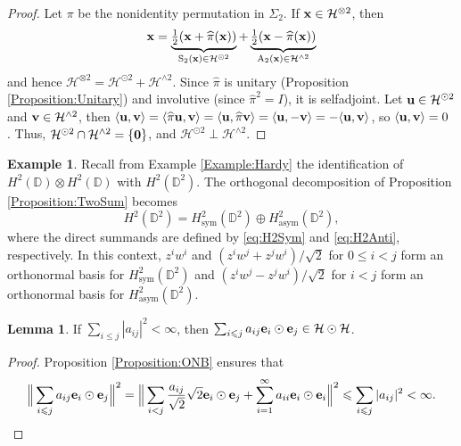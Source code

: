 \documentclass[10pt,reqno]{amsart}
\newcommand{\0}{{\color{lightgray}0}}
\newcommand{\A}{\mathrm{A}}
\renewcommand{\S}{\mathrm{S}}
\newcommand{\D}{\mathbb{D}}
\renewcommand{\leq}{\leqslant}
\newcommand{\h}{\mathcal{H}}
\renewcommand{\hat}{\widehat}
\renewcommand{\vec}[1]{{\bf #1}}
\theoremstyle{definition}
\newtheorem{Lemma}[equation]{Lemma}
\newtheorem{Example}[equation]{Example}
\numberwithin{equation}{section}
\begin{document}
\begin{proof}
Let $\pi$ be the nonidentity permutation in $\Sigma_2$. 
If $\vec{x} \in \h^{\otimes 2}$, then
\begin{equation}\label{orthogonalproj}
    \vec{x}
    =\underbrace{\tfrac{1}{2}(\vec{x}+\hat{\pi}(\vec{x})) }_{\S_2(\vec{x}) \in \h^{\odot 2}}
    +\underbrace{\tfrac{1}{2}(\vec{x}-\hat{\pi}(\vec{x})) }_{\A_2(\vec{x}) \in \h^{\wedge 2}}
\end{equation}
and hence $\h^{\otimes 2}= \h^{\odot 2} + \h^{\wedge 2}$.
Since $\hat{\pi}$ is unitary (Proposition \ref{Proposition:Unitary}) and
involutive (since $\hat{\pi}^2 =I$), it is selfadjoint.  
Let $\vec{u} \in \h^{\odot 2}$ and $\vec{v} \in \h^{ \wedge 2}$, then 
$
\langle \vec{u}, \vec{v}\rangle =\langle \hat{\pi}\vec{u},\vec{v}\rangle 
=\langle \vec{u},\hat{\pi}\vec{v} \rangle =\langle \vec{u},-\vec{v}\rangle =-\langle \vec{u},\vec{v}\rangle$,
so $\langle \vec{u},\vec{v}\rangle =0$ .  Thus,  $\h^{\odot 2}\cap \h^{\wedge 2} =\{ \vec{0} \}$, and $\h^{\odot 2} \perp \h^{\wedge 2}$.
\end{proof}


\begin{Example}
Recall from Example \ref{Example:Hardy} the identification of $H^2(\D) \otimes H^2(\D)$ with $H^2(\D^2)$.
The orthogonal decomposition of Proposition \ref{Proposition:TwoSum} becomes
\begin{equation}\label{eq:H2DirectSum}
H^2(\D^2) = H^2_{\operatorname{sym}}(\D^2) \oplus H^2_{\operatorname{asym}}(\D^2),
\end{equation}
where the direct summands are defined by \eqref{eq:H2Sym} and \eqref{eq:H2Anti}, respectively.
In this context, $z^i w^i$ and $( z^i w^j + z^j w^i)/\sqrt{2}$ for $0 \leq i < j$ 
form an orthonormal basis for $H^2_{\operatorname{sym}}(\D^2)$ and 
$(z^i w^j - z^j w^i)/\sqrt{2}$ for $i < j$ form an orthonormal basis for $H^2_{\operatorname{asym}}(\D^2)$.
\end{Example}

\begin{Lemma}\label{Lemma:SquareSumConverge}
If $\sum_{i \leq j} | a_{ij}|^2 < \infty$, then $\sum_{i \leq j} a_{ij} \vec{e}_i \odot \vec{e}_j \in \h \odot \h $.
\end{Lemma}

\begin{proof}
Proposition \eqref{Proposition:ONB} ensures that
\begin{equation*}
\Big\|\sum_{i \leq j} a_{ij} \vec{e}_i \odot \vec{e}_j\Big\|^2 
= \Big\|\sum_{i < j} \frac{a_{ij}}{\sqrt{2}} \sqrt{2} \vec{e}_i \odot \vec{e}_j + \sum_{i = 1}^{\infty} a_{ii} \vec{e}_i \odot \vec{e}_i \Big\|^2
\leq  \sum_{i \leq j} |a_{ij}|^2  < \infty. \qedhere
\end{equation*}
\end{proof}
\end{document}
